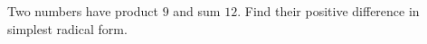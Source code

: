 Two numbers have product $9$ and sum $12$. Find their positive difference in simplest radical form.
